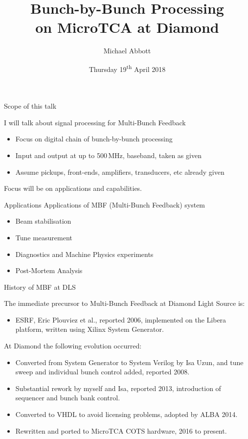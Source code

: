 \documentclass[xcolor=table]{beamer}
\title{Bunch-by-Bunch Processing \\on MicroTCA at Diamond}
\author{Michael Abbott}
\institute{Diamond Light Source}
\date{Thursday 19\textsuperscript{th} April 2018}
\begin{document}
\frame{\titlepage}


%
\begin{frame}{Scope of this talk}

I will talk about signal processing for Multi-Bunch Feedback

\begin{itemize}
\item Focus on digital chain of bunch-by-bunch processing
\item Input and output at up to 500\,MHz, baseband, taken as given
\item Assume pickups, front-ends, amplifiers, transducers, etc already given
\end{itemize}

Focus will be on applications and capabilities.

\end{frame}


%
\begin{frame}{Applications}
Applications of MBF (Multi-Bunch Feedback) system

\begin{itemize}
\item Beam stabilisation
\item Tune measurement
\item Diagnostics and Machine Physics experiments
\item Post-Mortem Analysis
\end{itemize}

\end{frame}


%
\begin{frame}{History of MBF at DLS}

\footnotesize

The immediate precursor to Multi-Bunch Feedback at Diamond Light Source is:

\begin{itemize}
\item ESRF, Eric Plouviez et al., reported 2006, implemented on the Libera
    platform, written using Xilinx System Generator.
\end{itemize}

At Diamond the following evolution occurred:

\begin{itemize}
\item Converted from System Generator to System Verilog by Isa Uzun, and tune
    sweep and individual bunch control added, reported 2008.
\item Substantial rework by myself and Isa, reported 2013, introduction of
    sequencer and bunch bank control.
\item Converted to VHDL to avoid licensing problems, adopted by ALBA 2014.
\item Rewritten and ported to MicroTCA COTS hardware, 2016 to present.
\end{itemize}

\end{frame}
\end{document}
